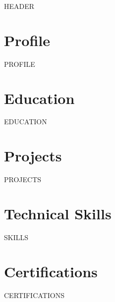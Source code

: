 


{{HEADER}}

\section{Profile}
{{PROFILE}}

\section{Education}
{{EDUCATION}}

\section{Projects}
{{PROJECTS}}

\section{Technical Skills}
{{SKILLS}}

\section{Certifications}
{{CERTIFICATIONS}}

